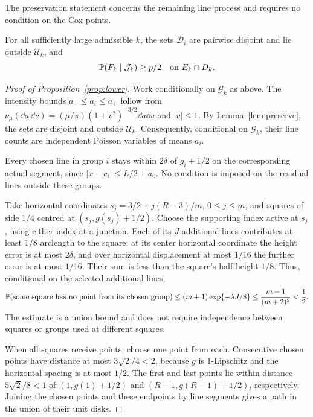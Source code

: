 \documentclass[11pt,letterpaper]{article}
\begin{document}
The preservation statement concerns the remaining line process and requires no condition on the Cox points.

\begin{lemma}\label{lem:preserve}
For all sufficiently large admissible $k$, the sets $\mathscr D_i$ are pairwise disjoint and lie outside $\mathscr U_k$, and
\[
 \P(F_k\mid\mathcal J_k)\ge p/2
 \quad\text{on }E_k\cap D_k.
\]
\end{lemma}

\begin{proof}[Proof of Proposition~\ref{prop:lower}]
Work conditionally on $\mathcal G_k$ as above. The intensity bounds $a_-\le a_i\le a_+$ follow from $\nu_\mu(\dd a\,\dd v)=(\mu/\pi)(1+v^2)^{-3/2}\dd a\dd v$ and $|v|\le1$. By Lemma~\ref{lem:preserve}, the sets are disjoint and outside $\mathscr U_k$. Consequently, conditional on $\mathcal G_k$, their line counts are independent Poisson variables of means $a_i$.

Every chosen line in group $i$ stays within $2\delta$ of $g_i+1/2$ on the corresponding actual segment, since $|x-c_i|\le L/2+a_0$. No condition is imposed on the residual lines outside these groups.

Take horizontal coordinates $s_j=3/2+j(R-3)/m$, $0\le j\le m$, and squares of side $1/4$ centred at $(s_j,g(s_j)+1/2)$. Choose the supporting index active at $s_j$, using either index at a junction. Each of its $J$ additional lines contributes at least $1/8$ arclength to the square: at its center horizontal coordinate the height error is at most $2\delta$, and over horizontal displacement at most $1/16$ the further error is at most $1/16$. Their sum is less than the square's half-height $1/8$. Thus, conditional on the selected additional lines,
\begin{equation}\label{eq:boxes}
 \P(\text{some square has no point from its chosen group})
 \le(m+1)\exp\{-\lambda J/8\}
 \le\frac{m+1}{(m+2)^2}<\frac12.
\end{equation}
The estimate is a union bound and does not require independence between squares or groups used at different squares.

When all squares receive points, choose one point from each. Consecutive chosen points have distance at most $3\sqrt2/4<2$, because $g$ is $1$-Lipschitz and the horizontal spacing is at most $1/2$. The first and last points lie within distance $5\sqrt2/8<1$ of $(1,g(1)+1/2)$ and $(R-1,g(R-1)+1/2)$, respectively. Joining the chosen points and these endpoints by line segments gives a path in the union of their unit disks.


\end{proof}
\end{document}
